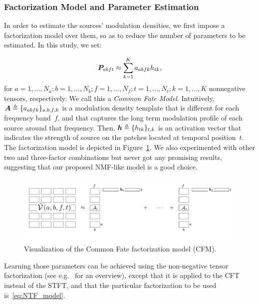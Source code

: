 \subsubsection{Factorization Model and Parameter Estimation}
\label{sub:NTF}

In order to estimate the sources' modulation densities, we first impose
a factorization model over them, so as to reduce the number of parameters
to be estimated. In this study, we set:

\begin{equation}
{\bm{P}}_{abft} \approx \sum_{k=1}^{K}a_{abfk}h_{tk},\label{eq:NTF_model}
\end{equation}
for  $a=1,\ldots,N_a;b=1,\ldots,N_b;f=1,\ldots,N_f;t=1,\ldots,N_t;k=1,\ldots,K$
nonnegative tensors, respectively. We call this a \emph{Common Fate
Model}. Intuitively, ${\bm{A}} \triangleq \{a_{abfk}\}_{a,b,f,k}$ is a modulation density template that
is different for each frequency band~$f$, and that captures the
long term modulation profile of each source around that frequency.
Then, ${\bm{h}} \triangleq \{h_{tk}\}_{t,k}$ is an activation vector that indicates the strength
of source on the patches located at temporal position~$t$.
The factorization model is depicted in Figure~\ref{fig:cfm}.
We also experimented with other two and three-factor combinations but never got any promising results, suggesting that our proposed NMF-like model is a good choice.

\begin{figure}[!htbp]
\centering
\includegraphics[width=0.8\columnwidth]{Chapters/06_Separation_Unknown/figures/cfm.pdf}
\caption{Visualization of the Common Fate factorization model (CFM).}
\label{fig:cfm}
\end{figure}


Learning those parameters can be achieved using the non-negative
tensor factorization (see e.g.~\cite{cichoki09,ozerov12,smaragdis14}
for an overview), except that it is applied to the CFT instead of the STFT,
and that the particular factorization to be used is~\eqref{eq:NTF_model}.

